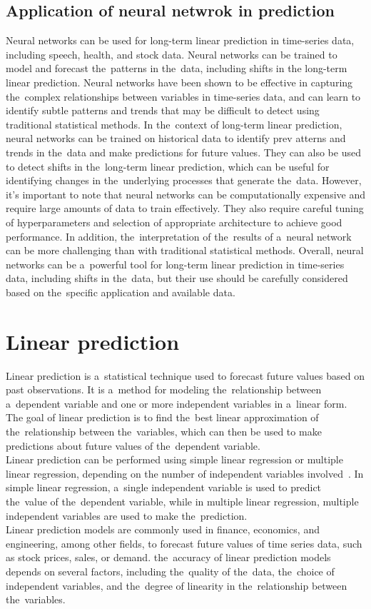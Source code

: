 \subsection{Application of neural netwrok in prediction} \label{subsec:nnprediction}
Neural networks can be used for long-term linear prediction in time-series data, including speech, health, and
stock data. Neural networks can be trained to model and forecast the~patterns in the~data, including shifts in
the long-term linear prediction. Neural networks have been shown to be effective in capturing the~complex relationships
between variables in time-series data, and can learn to identify subtle patterns and trends that may be difficult
to detect using traditional statistical methods. In the~context of long-term linear prediction, neural networks can be
trained on historical data to identify prev    atterns and trends in the~data and make predictions for future values.
They can also be used to detect shifts in the~long-term linear prediction, which can be useful for identifying
changes in the~underlying processes that generate the~data. However, it's important to note that neural networks
can be computationally expensive and require large amounts of data to train effectively. They also require careful
tuning of hyperparameters and selection of appropriate architecture to achieve good performance.
In addition, the~interpretation of the~results of a~neural network can be more challenging than with traditional
statistical methods. Overall, neural networks can be a~powerful tool for long-term linear prediction in time-series
data, including shifts in the~data, but their use should be carefully considered based on the~specific
application and available data.


\section{Linear prediction} \label{sec:lp}
Linear prediction is a~statistical technique used to forecast future values based on past observations. It is a~method
for modeling the~relationship between a~dependent variable and one or more independent variables in a~linear form.
The goal of linear prediction is to find the~best linear approximation of the~relationship between the~variables,
which can then be used to make predictions about future values of the~dependent variable.
\\
Linear prediction can be performed using simple linear regression or multiple linear regression, depending on the
number of independent variables involved~\cite{Parks}. In simple linear regression, a~single independent variable is
used to predict the~value of the~dependent variable, while in multiple linear regression, multiple independent
variables are used to make the~prediction.
\\
Linear prediction models are commonly used in finance, economics, and engineering, among other fields, to forecast
future values of time series data, such as stock prices, sales, or demand. the~accuracy of linear prediction models
depends on several factors, including the~quality of the~data, the~choice of independent variables, and the~degree of
linearity in the~relationship between the~variables.

